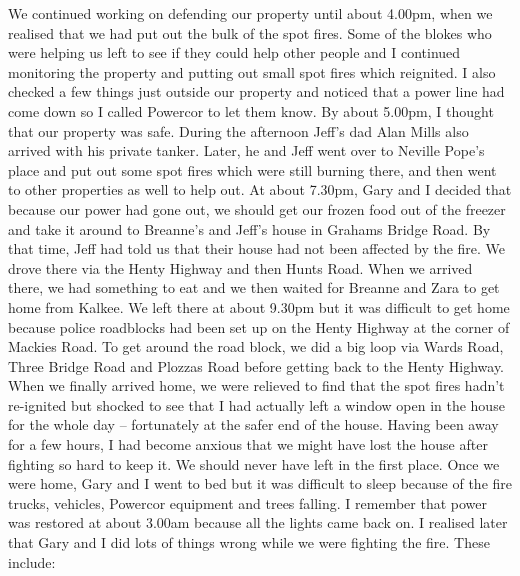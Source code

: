 \documentclass[a4paper]{article}
\begin{document}
    We continued working on defending our property until about 4.00pm, when we realised that we had put out the bulk of the spot fires. Some of the blokes who were helping us left to see if they could help other people and I continued monitoring the property and putting out small spot fires which reignited. I also checked a few things just outside our property and noticed that a power line had come down so I called Powercor to let them know. By about 5.00pm, I thought that our property was safe. During the afternoon Jeff's dad Alan Mills also arrived with his private tanker. Later, he and Jeff went over to Neville Pope's place and put out some spot fires which were still burning there, and then went to other properties as well to help out.
    At about 7.30pm, Gary and I decided that because our power had gone out, we should get our frozen food out of the freezer and take it around to Breanne's and Jeff's house in Grahams Bridge Road. By that time, Jeff had told us that their house had not been affected by the fire. We drove there via the Henty Highway and then Hunts Road. When we arrived there, we had something to eat and we then waited for Breanne and Zara to get home from Kalkee. We left there at about 9.30pm but it was difficult to get home because police roadblocks had been set up on the Henty Highway at the corner of Mackies Road. To get around the road block, we did a big loop via Wards Road, Three Bridge Road and Plozzas Road before getting back to the Henty Highway. When we finally arrived home, we were relieved to find that the spot fires hadn't re-ignited but shocked to see that I had actually left a window open in the house for the whole day – fortunately at the safer end of the house. Having been away for a few hours, I had become anxious that we might have lost the house after fighting so hard to keep it. We should never have left in the first place.
    Once we were home, Gary and I went to bed but it was difficult to sleep because of the fire trucks, vehicles, Powercor equipment and trees falling. I remember that power was restored at about 3.00am because all the lights came back on.
    I realised later that Gary and I did lots of things wrong while we were fighting the fire. These include:
\end{document}
